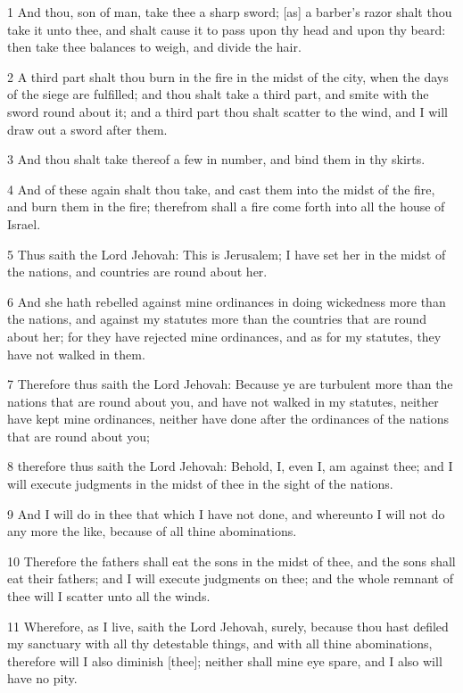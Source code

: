 \par 1 And thou, son of man, take thee a sharp sword; [as] a barber's razor shalt thou take it unto thee, and shalt cause it to pass upon thy head and upon thy beard: then take thee balances to weigh, and divide the hair.
\par 2 A third part shalt thou burn in the fire in the midst of the city, when the days of the siege are fulfilled; and thou shalt take a third part, and smite with the sword round about it; and a third part thou shalt scatter to the wind, and I will draw out a sword after them.
\par 3 And thou shalt take thereof a few in number, and bind them in thy skirts.
\par 4 And of these again shalt thou take, and cast them into the midst of the fire, and burn them in the fire; therefrom shall a fire come forth into all the house of Israel.
\par 5 Thus saith the Lord Jehovah: This is Jerusalem; I have set her in the midst of the nations, and countries are round about her.
\par 6 And she hath rebelled against mine ordinances in doing wickedness more than the nations, and against my statutes more than the countries that are round about her; for they have rejected mine ordinances, and as for my statutes, they have not walked in them.
\par 7 Therefore thus saith the Lord Jehovah: Because ye are turbulent more than the nations that are round about you, and have not walked in my statutes, neither have kept mine ordinances, neither have done after the ordinances of the nations that are round about you;
\par 8 therefore thus saith the Lord Jehovah: Behold, I, even I, am against thee; and I will execute judgments in the midst of thee in the sight of the nations.
\par 9 And I will do in thee that which I have not done, and whereunto I will not do any more the like, because of all thine abominations.
\par 10 Therefore the fathers shall eat the sons in the midst of thee, and the sons shall eat their fathers; and I will execute judgments on thee; and the whole remnant of thee will I scatter unto all the winds.
\par 11 Wherefore, as I live, saith the Lord Jehovah, surely, because thou hast defiled my sanctuary with all thy detestable things, and with all thine abominations, therefore will I also diminish [thee]; neither shall mine eye spare, and I also will have no pity.
